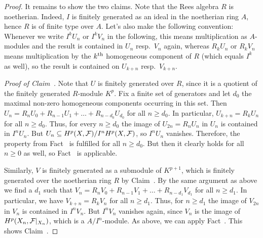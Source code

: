 \documentclass[a4paper,parskip=half,numbers=enddot, DIV=12]{scrreprt}
\renewcommand{\geq}{\geqslant}
\begin{document}
\begin{proof}
	It remains to show the two claims. Note that the Rees algebra $R$ is noetherian. Indeed, $I$ is finitely generated as an ideal in the noetherian ring $A$, hence $R$ is of finite type over $A$. Let's also make the following convention: Whenever we write $I^kU_n$ or $I^kV_n$ in the following, this means multiplication as $A$-modules and the result is contained in $U_n$ resp.\ $V_n$ again, whereas $R_kU_n$ or $R_kV_n$ means multiplication by the $k^{\text{th}}$ homogeneous component of $R$ (which equals $I^k$ as well), so the result is contained on $U_{k+n}$ resp.\ $V_{k+n}$.
	
	\emph{Proof of Claim~.} Note that $U$ is finitely generated over $R$, since it is a quotient of the finitely generated $R$-module $K^p$. Fix a finite set of generators and let $d_0$ the maximal non-zero homogeneous components occurring in this set. Then $U_n=R_nU_0+R_{n-1}U_1+\ldots+R_{n-d_0}U_{d_0}$ for all $n\geq d_0$. In particular, $U_{k+n}=R_kU_n$ for all $n\geq d_0$. Thus, for every $n\geq d_0$ the image of $U_{2n}=R_nU_n$ in $U_n$ is contained in $I^nU_n$. But $U_n\subseteq H^p(X,\mathcal{F})/I^nH^p(X,\mathcal{F})$, so $I^nU_n$ vanishes. Therefore, the property from Fact~ is fulfilled for all $n\geq d_0$. But then it clearly holds for all $n\geq 0$ as well, so Fact~ is applicable.
	
	Similarly, $V$ is finitely generated as a submodule of $K^{p+1}$, which is finitely generated over the noetherian ring $R$ by Claim~. By the same argument as above we find a $d_1$ such that $V_n=R_nV_0+R_{n-1}V_1+\ldots+R_{n-d_1}V_{d_1}$ for all $n\geqslant d_1$. In particular, we have $V_{k+n}=R_kV_n$ for all $n\geq d_1$. Thus, for $n\geq d_1$ the image of $V_{2n}$ in $V_n$ is contained in $I^nV_n$. But $I^nV_n$ vanishes again, since $V_n$ is the image of $H^p(X_n,\mathcal{F}|_{X_n})$, which is a $A/I^n$-module. As above, we can apply Fact~. This shows Claim~.
	

\end{proof}
\end{document}

